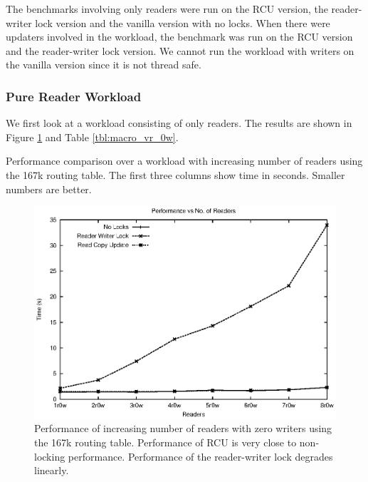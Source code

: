 \documentclass[a4paper]{article}
\begin{document}
The benchmarks involving only readers were run on the RCU version,
the reader-writer lock version and the vanilla version with no
locks. When there were updaters involved in the workload, the benchmark
was run on the RCU version and the reader-writer lock version. We
cannot run the workload with writers on the vanilla version since it
is not thread safe.

\subsubsection{Pure Reader Workload}
 We first look at a workload consisting of only readers. The results
 are shown in Figure \ref{img:macro_vr_0w} and Table
 \ref{tbl:macro_vr_0w}.

\begin{table}[tph]
\begin{center}
\scalebox{0.9} {

}
\end{center}
\caption{Performance comparison over a workload with increasing number of readers using the 167k routing table. The first three columns show time in seconds. Smaller numbers are better.}
\label{tbl:macro_vr_0w}
\end{table}

\begin{figure}[tph]
\centering
\includegraphics[scale=0.8]{../images/graphs/macro_vr_0w}
\caption[justification=justified]{Performance of increasing number of readers with zero writers using the 167k routing table. Performance of RCU is very close to non-locking performance. Performance of the reader-writer lock degrades linearly.}
\label{img:macro_vr_0w}
\end{figure}
\end{document}
